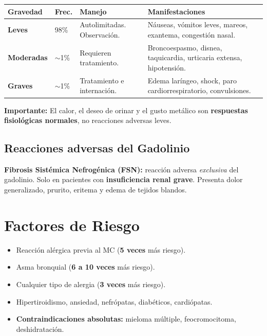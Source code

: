 \renewcommand{\arraystretch}{1.35}
\begin{center}
\begin{tabular}{>{\bfseries}p{2.2cm} p{1.8cm} p{4.5cm} p{5cm}}
\hline
Gravedad & Frec. & Manejo & Manifestaciones \\
\hline
\color{verdeclave}Leves & 98\% & Autolimitadas. Observación. & Náuseas, vómitos leves, mareos, exantema, congestión nasal. \\[0.5em]
\hline
\color{naranjadestacado}Moderadas & $\sim$1\% & Requieren tratamiento. & Broncoespasmo, disnea, taquicardia, urticaria extensa, hipotensión. \\[0.5em]
\hline
\color{rojoriesgo}Graves & $\sim$1\% & Tratamiento e internación. & Edema laríngeo, shock, paro cardiorrespiratorio, convulsiones. \\
\hline
\end{tabular}
\end{center}


\begin{cajariesgo}
\textbf{Importante:} El calor, el deseo de orinar y el gusto metálico son \textbf{respuestas fisiológicas normales}, no reacciones adversas leves.
\end{cajariesgo}

\subsection*{Reacciones adversas del Gadolinio}

\begin{cajariesgo}
\textbf{Fibrosis Sistémica Nefrogénica (FSN):} reacción adversa \textit{exclusiva} del gadolinio. Solo en pacientes con \textbf{insuficiencia renal grave}. Presenta dolor generalizado, prurito, eritema y edema de tejidos blandos.
\end{cajariesgo}

\section*{Factores de Riesgo}

\begin{itemize}[noitemsep]
  \item Reacción alérgica previa al MC (\textbf{5 veces} más riesgo).
  \item Asma bronquial (\textbf{6 a 10 veces} más riesgo).
  \item Cualquier tipo de alergia (\textbf{3 veces} más riesgo).
  \item Hipertiroidismo, ansiedad, nefrópatas, diabéticos, cardiópatas.
  \item \textbf{Contraindicaciones absolutas:} mieloma múltiple, feocromocitoma, deshidratación.
\end{itemize}


